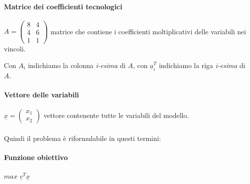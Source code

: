 \documentclass[12pt, twoside, letterpaper]{article}
\newcommand{\vx}[0]{
	\underline{x}
}
\newcommand{\va}[0]{
	\underline{a}
}
\begin{document}
				\paragraph{Matrice dei coefficienti tecnologici} $ A = \left (\begin{array}{ll}
						8 & 4\\
						4 & 6\\
						1 & 1
					\end{array}\right)$ 
					matrice che contiene i coefficienti moltiplicativi delle variabili nei vincoli.
					
					Con $A_i$ indichiamo la colonna \textit{i-esima} di $A$, con $\va^T_i$ indichiamo la riga \textit{i-esima} di $A$.
					
				\paragraph{Vettore delle variabili} $ \vx = \left (\begin{array}{l}
						x_1\\
						x_2
					\end{array}\right)$ 
					vettore contenente tutte le variabili del modello.\\\\
				Quindi il problema è riformulabile in questi termini:
				\paragraph{Funzione obiettivo} $max$ $\underline{c}^T \vx$ 
\end{document}
